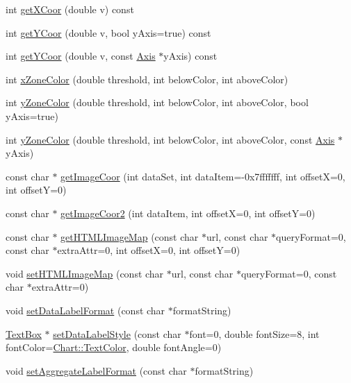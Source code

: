 \begin{DoxyCompactItemize}
int \hyperlink{class_layer_a9083b20a158e7096c52539f95dfd47a9}{get\+X\+Coor} (double v) const
\item 
int \hyperlink{class_layer_ab6939819507f042906513ec21489b3bc}{get\+Y\+Coor} (double v, bool y\+Axis=true) const
\item 
int \hyperlink{class_layer_aee258204d7c1ac071d71664025e48bc0}{get\+Y\+Coor} (double v, const \hyperlink{class_axis}{Axis} $\ast$y\+Axis) const
\item 
int \hyperlink{class_layer_a7a721e59aa2ade3230ba2ad76bab643a}{x\+Zone\+Color} (double threshold, int below\+Color, int above\+Color)
\item 
int \hyperlink{class_layer_ae8ce1036fc1aa65453eaf08612e96e33}{y\+Zone\+Color} (double threshold, int below\+Color, int above\+Color, bool y\+Axis=true)
\item 
int \hyperlink{class_layer_a3a39f0a1174c2ec7c37f477be5c69be8}{y\+Zone\+Color} (double threshold, int below\+Color, int above\+Color, const \hyperlink{class_axis}{Axis} $\ast$y\+Axis)
\item 
const char $\ast$ \hyperlink{class_layer_a8d8ff0e7b080f019c44e8a0b4080e6a0}{get\+Image\+Coor} (int data\+Set, int data\+Item=-\/0x7fffffff, int offset\+X=0, int offset\+Y=0)
\item 
const char $\ast$ \hyperlink{class_layer_ae23876451df3872e6b9ede9282b87fd8}{get\+Image\+Coor2} (int data\+Item, int offsetX=0, int offsetY=0)
\item 
const char $\ast$ \hyperlink{class_layer_ad4e641a703136de5642873341a52be7d}{get\+H\+T\+M\+L\+Image\+Map} (const char $\ast$url, const char $\ast$query\+Format=0, const char $\ast$extra\+Attr=0, int offsetX=0, int offsetY=0)
\item 
void \hyperlink{class_layer_a236aba467e0154dcfff6541731dc9ec5}{set\+H\+T\+M\+L\+Image\+Map} (const char $\ast$url, const char $\ast$query\+Format=0, const char $\ast$extra\+Attr=0)
\item 
void \hyperlink{class_layer_a63ed05427073630b637d8b0643b36526}{set\+Data\+Label\+Format} (const char $\ast$format\+String)
\item 
\hyperlink{class_text_box}{Text\+Box} $\ast$ \hyperlink{class_layer_ab9822ec131202c3959fa3235fb48746a}{set\+Data\+Label\+Style} (const char $\ast$font=0, double font\+Size=8, int font\+Color=\hyperlink{namespace_chart_abee0d882fdc9ad0b001245ad9fc64011a879e14f2f5024caccc047374342321ef}{Chart\+::\+Text\+Color}, double font\+Angle=0)
\item 
void \hyperlink{class_layer_a30589e1186d9fb1abcbc03782fbb1ae4}{set\+Aggregate\+Label\+Format} (const char $\ast$format\+String)

\end{DoxyCompactItemize}
